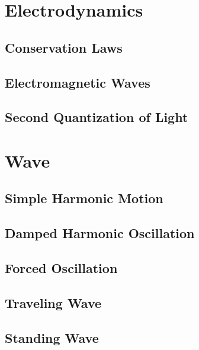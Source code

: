 \documentclass[10pt]{report}
\begin{document}
\chapter{Electrodynamics}
\clearpage
\section{Conservation Laws}
\clearpage

\section{Electromagnetic Waves}
\clearpage

\section{Second Quantization of Light}


 

\chapter{Wave}
\clearpage
\section{Simple Harmonic Motion}
\clearpage

\section{Damped Harmonic Oscillation}
\clearpage

\section{Forced Oscillation}
\clearpage

\section{Traveling Wave}
\clearpage
\clearpage

\section{Standing Wave}
\clearpage
\end{document}
